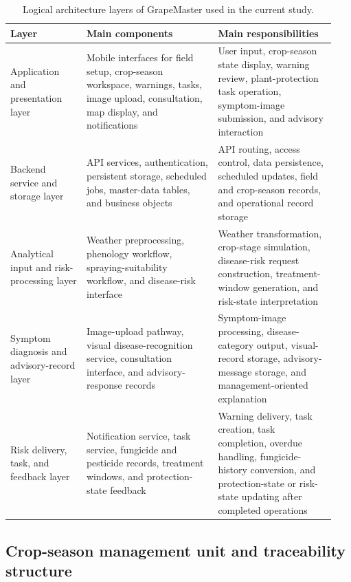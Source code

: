 \documentclass[12pt]{article}
\newcommand{\tablefontsize}{\fontsize{9pt}{11pt}\selectfont}
\begin{document}
\begin{table}[H]
\centering
\caption{Logical architecture layers of GrapeMaster used in the current study.}
\label{tab:architecture_layers}
\tablefontsize
\begin{tabular}{@{}p{0.22\linewidth} p{0.38\linewidth} p{0.34\linewidth}@{}}
\toprule
Layer & Main components & Main responsibilities \\
\midrule
Application and presentation layer & Mobile interfaces for field setup, crop-season workspace, warnings, tasks, image upload, consultation, map display, and notifications & User input, crop-season state display, warning review, plant-protection task operation, symptom-image submission, and advisory interaction \\
Backend service and storage layer & API services, authentication, persistent storage, scheduled jobs, master-data tables, and business objects & API routing, access control, data persistence, scheduled updates, field and crop-season records, and operational record storage \\
Analytical input and risk-processing layer & Weather preprocessing, phenology workflow, spraying-suitability workflow, and disease-risk interface & Weather transformation, crop-stage simulation, disease-risk request construction, treatment-window generation, and risk-state interpretation \\
Symptom diagnosis and advisory-record layer & Image-upload pathway, visual disease-recognition service, consultation interface, and advisory-response records & Symptom-image processing, disease-category output, visual-record storage, advisory-message storage, and management-oriented explanation \\
Risk delivery, task, and feedback layer & Notification service, task service, fungicide and pesticide records, treatment windows, and protection-state feedback & Warning delivery, task creation, task completion, overdue handling, fungicide-history conversion, and protection-state or risk-state updating after completed operations \\
\bottomrule
\end{tabular}
\end{table}

\subsection{Crop-season management unit and traceability structure}\label{crop-season-management-unit-and-traceability-structure}
\end{document}
